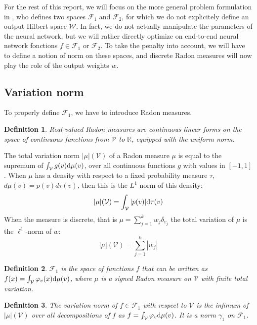\documentclass[a4paper, 11pt]{scrartcl}
\newtheorem{definition}{Definition}[section]
\begin{document}
{For the rest of this report, we will focus on the more general problem formulation in \cite{bach2017breaking}, who defines two spaces $\mathcal{F}_1$ and $\mathcal{F}_2$, for which we do not explicitely define an output Hilbert space $\mathcal{W}$. In fact, we do not actually manipulate the parameters of the neural network, but we will rather directly optimize on end-to-end neural network fonctions $f \in \mathcal{F}_1$ or $\mathcal{F}_2$. To take the penalty into account, we will have to define a notion of norm on these spaces, and discrete Radon measures will now play the role of the output weights $w$.

\subsection{Variation norm}

To properly define $\mathcal{F}_1$, we have to introduce Radon measures.

\begin{definition}
Real-valued Radon measures are continuous linear forms on the space of continuous functions from $\mathcal{V}$ to $\mathbb{R}$, equipped with the uniform norm.
\end{definition}

The total variation norm $|\mu|(\mathcal{V})$ of a Radon measure $\mu$  is equal to the supremum of $\int_\mathcal{V} g(v)\textnormal{d}\mu(v)$, over all continuous functions $g$ with values in $[-1, 1]$. When $\mu$ has a density with respect to a fixed probability measure $\tau$, ${d}\mu(v) = p(v) {d}\tau(v)$, then this is the $L^1$ norm of this density: $$|\mu|(\mathcal{V}) = \int_\mathcal{V} |p(v)| \textnormal{d}\tau(v)$$
When the measure is discrete, that is $\mu = \sum_{j=1}^k w_j \delta_{v_j}$ the total variation of $\mu$ is the $\ell^1$-norm of $w$:
$$|\mu|(\mathcal{V}) = \sum_{j=1}^k |w_j|  $$

\begin{definition}
$\mathcal{F}_1$ is the space of functions $f$ that can be written as
$f(x)= \int_\mathcal{V} \varphi_v(x)\textnormal{d}\mu(v)$,
where $\mu$ is a signed Radon measure on $\mathcal{V}$ with finite total variation.
\end{definition}

\begin{definition}
The variation norm of $f \in \mathcal{F}_1$ with respect to $\mathcal{V}$ is the infimum of $|\mu|(\mathcal{V})$ over all decompositions of $f$ as $f= \int_\mathcal{V} \varphi_v\textnormal{d}\mu(v)$. It is a norm $\gamma_1$ on $\mathcal{F}_1$.
\end{definition}

}
\end{document}
